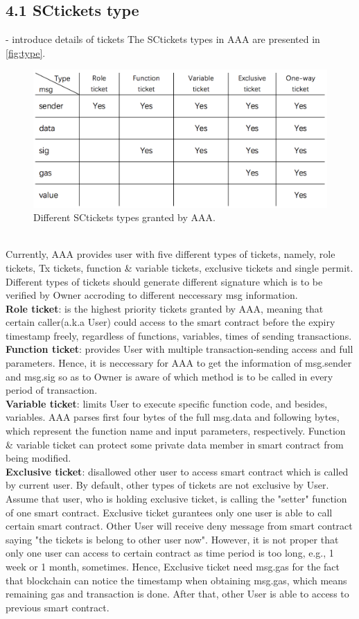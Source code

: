 \subsection*{4.1 SCtickets type}
- introduce details of tickets
\noindent The SCtickets types in AAA are presented in \autoref{fig:type}.
\begin{figure}[h!]
  \centering
  \includegraphics[width=1.0\linewidth]{fig/type}
  \caption{Different SCtickets types granted by AAA.}
  \label{fig:type}
\end{figure}
\\\indent Currently, AAA provides user with five different types of tickets, namely, role tickets, Tx tickets, function \& variable tickets, exclusive tickets and single permit. Different types of tickets should generate different signature which is to be verified by Owner accroding to different neccessary msg information.
\\\textbf{Role ticket}: is the highest priority tickets granted by AAA, meaning that certain caller(a.k.a User) could access to the smart contract before the expiry timestamp freely, regardless of functions, variables, times of sending transactions.
\\\textbf{Function ticket}: provides User with multiple transaction-sending access and full parameters. Hence, it is neccessary for AAA to get the information of msg.sender and msg.sig so as to Owner is aware of which method is to be called in every period of transaction.
\\\textbf{Variable ticket}: limits User to execute specific function code, and besides, variables. AAA parses first four bytes of the full msg.data and following bytes, which represent the function name and input parameters, respectively. Function \& variable ticket can protect some private data member in smart contract from being modified.
\\\textbf{Exclusive ticket}: disallowed other user to access smart contract which is called by current user. By default, other types of tickets are not exclusive by User. Assume that user, who is holding exclusive ticket, is calling the "setter" function of one smart contract. Exclusive ticket gurantees only one user is able to call certain smart contract. Other User will receive deny message from smart contract saying "the tickets is belong to other user now". However, it is not proper that only one user can access to certain contract as time period is too long, e.g., 1 week or 1 month, sometimes. Hence, Exclusive ticket need msg.gas for the fact that blockchain can notice the timestamp when obtaining msg.gas, which means remaining gas and transaction is done. After that, other User is able to access to previous smart contract.

